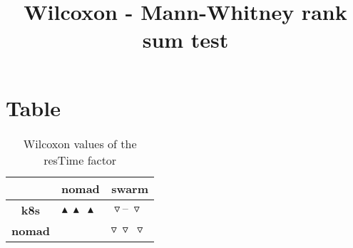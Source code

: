 \documentclass{article}
\title{Wilcoxon - Mann-Whitney rank sum test}
\author{}
\begin{document}
\maketitle
\section{Table}
\begin{table}[!htp]
  \caption{Wilcoxon values of the resTime factor}
  \label{table:resTime}
  \centering
  \begin{scriptsize}
  \begin{tabular}{c|cc}
      & \textbf{nomad} & \textbf{swarm} \\\hline
      \textbf{k8s} & $\blacktriangle\ \blacktriangle\ \blacktriangle\  $ & $ \triangledown\ \text{--}\ \triangledown\ $ \\
      \textbf{nomad} & $ $ & $ \triangledown\ \triangledown\ \triangledown\ $ \\
  \end{tabular}
  \end{scriptsize}
\end{table}
\end{document}
